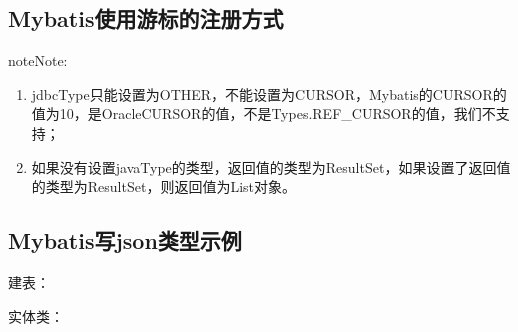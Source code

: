 \documentclass[letterpaper,10pt,english]{sphinxmanual}
\begin{document}
\subsection{Mybatis使用游标的注册方式}
\label{\detokenize{interface/mybatis:id3}}
\begin{sphinxVerbatim}[commandchars=\\\{\}]
  
\end{sphinxVerbatim}

\begin{sphinxadmonition}{note}{Note:}\begin{enumerate}
%
\item {} 
jdbcType只能设置为OTHER，不能设置为CURSOR，Mybatis的CURSOR的值为\sphinxhyphen{}10，是OracleCURSOR的值，不是Types.REF\_CURSOR的值，我们不支持；

\item {} 
如果没有设置javaType的类型，返回值的类型为ResultSet，如果设置了返回值的类型为ResultSet，则返回值为List对象。

\end{enumerate}
\end{sphinxadmonition}


\subsection{Mybatis写json类型示例}
\label{\detokenize{interface/mybatis:mybatisjson}}
建表：

\begin{sphinxVerbatim}[commandchars=\\\{\}]
    
\end{sphinxVerbatim}

实体类：
\end{document}
